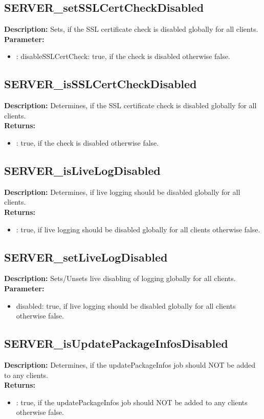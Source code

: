 \subsection{SERVER\_setSSLCertCheckDisabled}
\textbf{Description:} Sets, if the SSL certificate check is disabled globally for all clients.\\
\textbf{Parameter:}
\begin{itemize}
\item : disableSSLCertCheck: true, if the check is disabled otherwise false.
\end{itemize}

\subsection{SERVER\_isSSLCertCheckDisabled}
\textbf{Description:} Determines, if the SSL certificate check is disabled globally for all clients.\\
\textbf{Returns:}
\begin{itemize}
\item : true, if the check is disabled otherwise false.
\end{itemize}

\subsection{SERVER\_isLiveLogDisabled}
\textbf{Description:} Determines, if live logging should be disabled globally for all clients.\\
\textbf{Returns:}
\begin{itemize}
\item : true, if live logging should be disabled globally for all clients otherwise false.
\end{itemize}

\subsection{SERVER\_setLiveLogDisabled}
\textbf{Description:} Sets/Unsets live disabling of logging globally for all clients.\\
\textbf{Parameter:}
\begin{itemize}
\item disabled: true, if live logging should be disabled globally for all clients otherwise false.
\end{itemize}

\subsection{SERVER\_isUpdatePackageInfosDisabled}
\textbf{Description:} Determines, if the updatePackageInfos job should NOT be added to any clients.\\
\textbf{Returns:}
\begin{itemize}
\item : true, if the updatePackageInfos job should NOT be added to any clients otherwise false.
\end{itemize}

